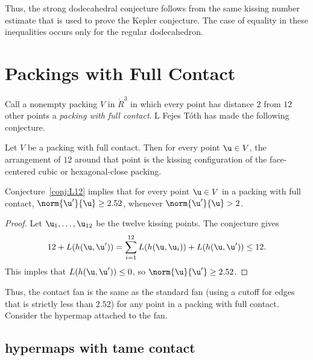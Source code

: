 Thus, the strong dodecahedral conjecture follows from the same kissing
number estimate that is used to prove the Kepler conjecture.  The case
of equality in these inequalities occurs only for the regular
dodecahedron.

\section{Packings with Full Contact}



Call a nonempty packing $ V$ in $\ring{R}^3$ in which every point has
distance $2$ from $12$ other points a {\it packing with full
  contact}. L Fejes T\'oth has made the following conjecture.
%
%
%

\begin{conjecture} Let $ V$ be a packing with full
  contact.  Then for every point $ \u\in V$, the arrangement of $12$
  around that point is the kissing configuration of the face-centered
  cubic or hexagonal-close packing.
\end{conjecture}
%
%
%

\begin{lemma}[] Conjecture~\ref{conj:L12} implies that for
  every point $ \u\in V$ in a packing with full contact, $\norm{ \u'}{
    \u}\ge 2.52$, whenever $\norm{ \u'}{ \u}> 2$.
\end{lemma}
%
%

\begin{proof} Let $ \u_1,\ldots, \u_{12}$ be the twelve kissing
  points.  The conjecture gives
\begin{displaymath}
  12 + L(h( \u, \u')) 
= \sum_{i=1}^{12} L(h( \u, \u_i)) + L(h( \u, \u')) \le 12.
\end{displaymath}
This imples that $L(h( \u, \u'))\le 0$, so $\norm{ \u}{ \u'}\ge 2.52$.
\end{proof}

Thus, the contact fan is the same as the standard fan (using a cutoff
for edges that is strictly less than $2.52$) for any point in a
packing with full contact.  Consider the hypermap attached to the fan.
%
%


\subsection{hypermaps with tame contact}

